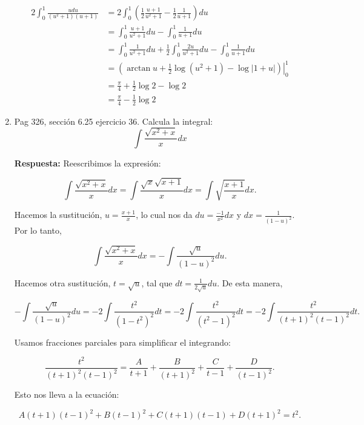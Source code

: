 \documentclass{report}
\begin{document}
\begin{enumerate}
        $$
        \begin{aligned}
        2 \int_{0}^{1} \frac{u d u}{\left(u^{2}+1\right)(u+1)} & =2 \int_{0}^{1}\left(\frac{1}{2} \frac{u+1}{u^{2}+1}-\frac{1}{2} \frac{1}{u+1}\right) d u \\
        & =\int_{0}^{1} \frac{u+1}{u^{2}+1} d u-\int_{0}^{1} \frac{1}{u+1} d u \\
        & =\int_{0}^{1} \frac{1}{u^{2}+1} d u+\frac{1}{2} \int_{0}^{1} \frac{2 u}{u^{2}+1} d u-\int_{0}^{1} \frac{1}{u+1} d u \\
        & =\left.\left(\arctan u+\frac{1}{2} \log \left(u^{2}+1\right)-\log |1+u|\right)\right|_{0} ^{1} \\
        & =\frac{\pi}{4}+\frac{1}{2} \log 2-\log 2 \\
        & =\frac{\pi}{4}-\frac{1}{2} \log 2
        \end{aligned}
        $$
        
        \item Pag 326, sección 6.25 ejercicio 36. Calcula la integral: 
        $$\int \frac{\sqrt{x^{2}+x}}{x} dx$$
        
        \textbf{Respuesta:} Reescribimos la expresión: 
        
        $$
        \int \frac{\sqrt{x^{2}+x}}{x} dx=\int \frac{\sqrt{x} \sqrt{x+1}}{x} dx=\int \sqrt{\frac{x+1}{x}} dx .
        $$
        
        Hacemos la sustitución, $u=\frac{x+1}{x}$, lo cual nos da $du=\frac{-1}{x^{2}} dx$ y $dx=\frac{1}{(1-u)^{2}}$. Por lo tanto,
        
        $$
        \int \frac{\sqrt{x^{2}+x}}{x} dx=-\int \frac{\sqrt{u}}{(1-u)^{2}} du .
        $$
        
        Hacemos otra sustitución, $t=\sqrt{u}$, tal que $dt=\frac{1}{2 \sqrt{u}} du$. De esta manera,
        
        $$
        -\int \frac{\sqrt{u}}{(1-u)^{2}} du=-2 \int \frac{t^{2}}{\left(1-t^{2}\right)^{2}} dt=-2 \int \frac{t^{2}}{\left(t^{2}-1\right)^{2}} dt=-2 \int \frac{t^{2}}{(t+1)^{2}(t-1)^{2}} dt.
        $$
        
        Usamos fracciones parciales para simplificar el integrando:
        
        $$
        \frac{t^{2}}{(t+1)^{2}(t-1)^{2}}=\frac{A}{t+1}+\frac{B}{(t+1)^{2}}+\frac{C}{t-1}+\frac{D}{(t-1)^{2}}.
        $$
        
        Esto nos lleva a la ecuación:
        
        $$
        A(t+1)(t-1)^{2}+B(t-1)^{2}+C(t+1)(t-1)+D(t+1)^{2}=t^{2}.
        $$
        

\end{enumerate}
\end{document}
